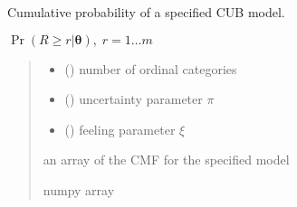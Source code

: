\documentclass[letterpaper,10pt,english]{sphinxmanual}
\begin{document}
\begin{fulllineitems}
\label{\detokenize{cubmods:cubmods.cub.cmf}}
\pysigstartsignatures
{}
\pysigstopsignatures
\sphinxAtStartPar
Cumulative probability of a specified CUB model.

\sphinxAtStartPar
\(\Pr(R \geq r | \pmb\theta),\; r=1 \ldots m\)
\begin{quote}\begin{description}
\begin{itemize}
\item {} 
\sphinxAtStartPar
{} () \textendash{} number of ordinal categories

\item {} 
\sphinxAtStartPar
{} () \textendash{} uncertainty parameter \(\pi\)

\item {} 
\sphinxAtStartPar
{} () \textendash{} feeling parameter \(\xi\)

\end{itemize}

\sphinxAtStartPar
an array of the CMF for the specified model

\sphinxAtStartPar
numpy array

\end{description}\end{quote}

\end{fulllineitems}

\end{document}
